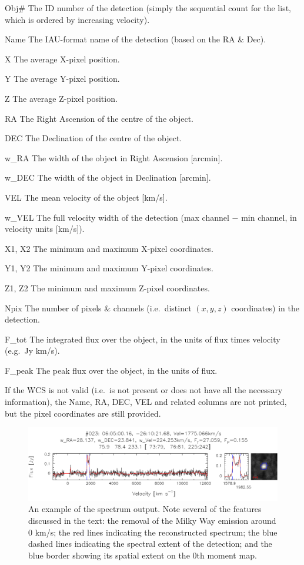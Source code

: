 \documentclass[12pt,a4paper]{article}
\newcommand{\eg}{e.g.\ }
\newcommand{\ie}{i.e.\ }
\newcommand{\entrylabel}[1]{\mbox{\textsf{\bf{#1:}}}\hfil}
\newenvironment{entry}
        {\begin{list}{}%
                {\renewcommand{\makelabel}{\entrylabel}%
                        \setlength{\labelwidth}{30mm}%
                        \setlength{\labelsep}{5pt}%
                        \setlength{\itemsep}{2pt}%
                        \setlength{\parsep}{2pt}%
                        \setlength{\leftmargin}{35mm}%
                }%
        }%
{\end{list}}
\begin{document}
\begin{entry}
\item[Obj\#] The ID number of the detection (simply the sequential
  count for the list, which is ordered by increasing velocity).
\item[Name] The IAU-format name of the detection (based on the RA \&
Dec).
\item[X] The average X-pixel position.
\item[Y] The average Y-pixel position.
\item[Z] The average Z-pixel position.
\item[RA] The Right Ascension of the centre of the object.
\item[DEC] The Declination of the centre of the object.
\item[w\_RA] The width of the object in Right Ascension [arcmin].
\item[w\_DEC] The width of the object in Declination [arcmin].
\item[VEL] The mean velocity of the object [km/s].
\item[w\_VEL] The full velocity width of the detection (max channel
  $-$ min channel, in velocity units [km/s]).
\item[X1, X2] The minimum and maximum X-pixel coordinates.
\item[Y1, Y2] The minimum and maximum Y-pixel coordinates.
\item[Z1, Z2] The minimum and maximum Z-pixel coordinates.
\item[Npix] The number of pixels \& channels (\ie distinct $(x,y,z)$
  coordinates) in the detection.
\item[F\_tot] The integrated flux over the object, in the units of
  flux times velocity (\eg Jy km/s).
\item[F\_peak] The peak flux over the object, in the units of flux.
\end{entry}
If the WCS is not valid (\ie is not present or does not have all the
necessary information), the Name, RA, DEC, VEL and related columns are not
printed, but the pixel coordinates are still provided.

\begin{figure}[t]
\begin{center}
\includegraphics[width=\textwidth]{example_spectrum}
\end{center}
\caption{\footnotesize An example of the spectrum output. Note several
  of the features discussed in the text: the removal of the Milky Way
  emission around 0 km/s; the red lines indicating the reconstructed
  spectrum; the blue dashed lines indicating the spectral extent of
  the detection; and the blue border showing its spatial extent on the
  0th moment map.}
\label{fig-spect}
\end{figure}
\end{document}
